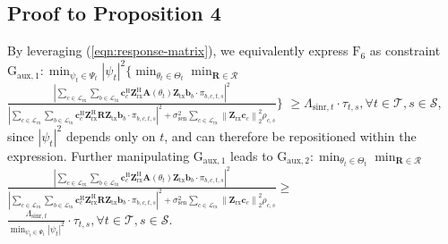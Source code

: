 \documentclass[10pt,journal,compsoc]{IEEEtran}
\theoremstyle{myremark}
\theoremstyle{myexample}
\begin{document}
\begin{appendices}
 


\setcounter{equation}{0}
\setcounter{table}{0}
\renewcommand{\theequation}{J.\arabic{equation}}
\section{Proof to Proposition 4} \label{app:proof-proposition-4}

By leveraging (\ref{eqn:response-matrix}), we equivalently express $ \mathrm{F}_{6} $ as constraint $ \mathrm{G}_{\mathrm{aux},1}: \min_{\psi_t \in \Psi_t} \left| \psi_t \right|^2 \Big\{ \min_{\theta_t \in \Theta_t} \min_{\mathbf{R} \in \mathcal{R}} $ $  \frac{ 
	\left| \sum_{c \in \mathcal{L}_\mathrm{rx}} \sum_{b \in \mathcal{L}_\mathrm{tx}}  \mathbf{c}_c^\mathrm{H} \mathbf{Z}_\mathrm{rx}^\mathrm{H} \mathbf{A} \left( \theta_t \right) \mathbf{Z}_\mathrm{tx} \mathbf{b}_b \cdot \pi_{b,c,t,s} \right|^2 } 
	{ \left| \sum_{c \in \mathcal{L}_\mathrm{rx}} \sum_{b \in \mathcal{L}_\mathrm{tx}}  \mathbf{c}_c^\mathrm{H} \mathbf{Z}_\mathrm{rx}^\mathrm{H} \mathbf{R} \mathbf{Z}_\mathrm{tx} \mathbf{b}_b \cdot \pi_{b,c,t,s} \right|^2 + \sigma_\mathrm{sen}^2 \sum_{c \in \mathcal{L}_\mathrm{rx}} \left\| \mathbf{Z}_\mathrm{rx} \mathbf{c}_c \right\|_2^2 \rho_{c,s} 
	} \Big\} $ $ \geq \Lambda_{\mathrm{sinr},t} \cdot \tau_{t,s}, \forall t \in \mathcal{T}, s \in \mathcal{S} $, since $ \left| \psi_t \right|^2  $ depends only on $ t $, and can therefore be repositioned within the expression. Further manipulating $ \mathrm{G}_{\mathrm{aux},1} $ leads to $ \mathrm{G}_{\mathrm{aux},2}: \min_{\theta_t \in \Theta_t}  \min_{\mathbf{R} \in \mathcal{R}} $ $ \frac{ 
	\left| \sum_{c \in \mathcal{L}_\mathrm{rx}} \sum_{b \in \mathcal{L}_\mathrm{tx}}  \mathbf{c}_c^\mathrm{H} \mathbf{Z}_\mathrm{rx}^\mathrm{H} \mathbf{A} \left( \theta_t \right) \mathbf{Z}_\mathrm{tx} \mathbf{b}_b \cdot \pi_{b,c,t,s} \right|^2 } 
	{ \left| \sum_{c \in \mathcal{L}_\mathrm{rx}} \sum_{b \in \mathcal{L}_\mathrm{tx}}  \mathbf{c}_c^\mathrm{H} \mathbf{Z}_\mathrm{rx}^\mathrm{H} \mathbf{R} \mathbf{Z}_\mathrm{tx} \mathbf{b}_b \cdot \pi_{b,c,t,s} \right|^2 + \sigma_\mathrm{sen}^2 \sum_{c \in \mathcal{L}_\mathrm{rx}} \left\| \mathbf{Z}_\mathrm{rx} \mathbf{c}_c \right\|_2^2 \rho_{c,s}
	} \geq $ $ \frac{\Lambda_{\mathrm{sinr},t}}{\min_{\psi_t \in \Psi_t} \left| \psi_t \right|^2 } \cdot \tau_{t,s} , \forall t \in \mathcal{T}, s \in \mathcal{S} $.



\end{appendices}
\end{document}
